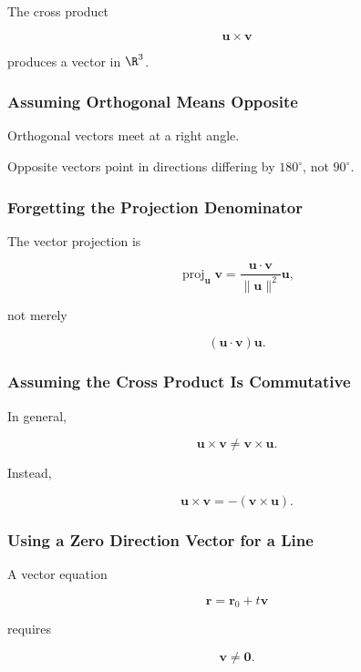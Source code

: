 The cross product

\[ \mathbf{u}\times\mathbf{v} \]

produces a vector in \(\R^3\).

\subsubsection{Assuming Orthogonal Means Opposite}

Orthogonal vectors meet at a right angle.

Opposite vectors point in directions differing by \(180^\circ\), not
\(90^\circ\).

\subsubsection{Forgetting the Projection Denominator}

The vector projection is

\[
\operatorname{proj}_{\mathbf{u}}\mathbf{v}
=
\frac{\mathbf{u}\cdot\mathbf{v}}
{\|\mathbf{u}\|^2}\mathbf{u},
\]

not merely

\[ (\mathbf{u}\cdot\mathbf{v})\mathbf{u}. \]

\subsubsection{Assuming the Cross Product Is Commutative}

In general,

\[ \mathbf{u}\times\mathbf{v}\neq\mathbf{v}\times\mathbf{u}. \]

Instead,

\[ \boxed{\mathbf{u}\times\mathbf{v}=-(\mathbf{v}\times\mathbf{u}).} \]

\subsubsection{Using a Zero Direction Vector for a Line}

A vector equation

\[ \mathbf{r}=\mathbf{r}_0+t\mathbf{v} \]

requires

\[ \mathbf{v}\neq\mathbf{0}. \]

